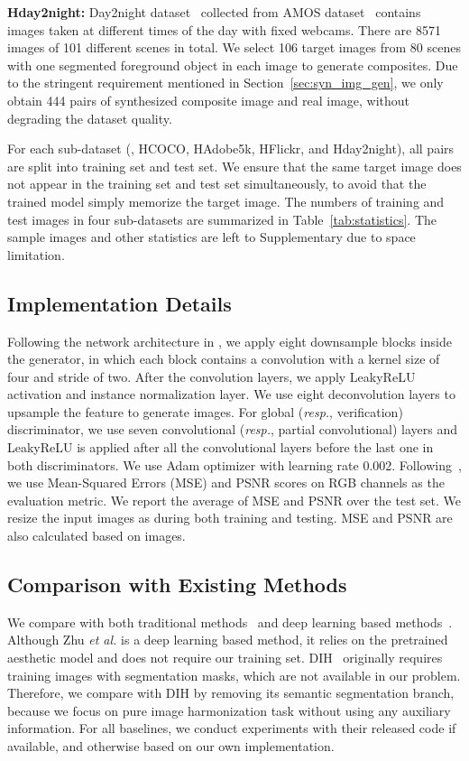 \documentclass[10pt,twocolumn,letterpaper]{article}
\begin{document}
\noindent\textbf{Hday2night: }Day2night dataset~\cite{zhou2016evaluating} collected from AMOS dataset~\cite{AMOSdataset} contains images taken at different times of the day with fixed webcams. There are 8571 images of 101 different scenes in total. We select 106 target images from 80 scenes with one segmented foreground object in each image to generate composites. Due to the stringent requirement mentioned in Section~\ref{sec:syn_img_gen}, we only obtain 444 pairs of synthesized composite image and real image, without degrading the dataset quality.


For each sub-dataset (\ie, HCOCO, HAdobe5k, HFlickr, and Hday2night), all pairs are split into training set and test set. We ensure that the same target image does not appear in the training set and test set simultaneously, to avoid that the trained model simply memorize the target image. The numbers of training and test images in four sub-datasets are summarized in Table~\ref{tab:statistics}. The sample images and other statistics are left to Supplementary due to space limitation.


\subsection{Implementation Details}
Following the network architecture in \cite{isola2017image}, we apply eight downsample blocks inside the generator, in which each block contains a convolution with a kernel size of four and stride of two. After the convolution layers, we apply LeakyReLU activation and instance normalization layer. We use eight deconvolution layers to upsample the feature to generate images. For global (\emph{resp.}, verification) discriminator, we use seven convolutional (\emph{resp.}, partial convolutional) layers and LeakyReLU is applied after all the convolutional layers before the last one in both discriminators.
We use Adam optimizer with learning rate 0.002.
Following~\cite{tsai2017deep}, we use Mean-Squared Errors (MSE) and PSNR scores on RGB channels as the evaluation metric. We report the average of MSE and PSNR over the test set.
We resize the input images as  during both training and testing. MSE and PSNR are also calculated based on  images.

\subsection{Comparison with Existing Methods}
We compare with both traditional methods~\cite{lalonde2007using,xue2012understanding} and deep learning based methods~\cite{zhu2015learning,tsai2017deep,xiaodong2019improving}. Although Zhu \emph{et al.} \cite{zhu2015learning} is a deep learning based method, it relies on the pretrained aesthetic model and does not require our training set. DIH~\cite{tsai2017deep} originally requires training images with segmentation masks, which are not available in our problem. Therefore, we compare with DIH by removing its semantic segmentation branch, because we focus on pure image harmonization task without using any auxiliary information.
For all baselines, we conduct experiments with their released code if available, and otherwise based on our own implementation.
\end{document}
